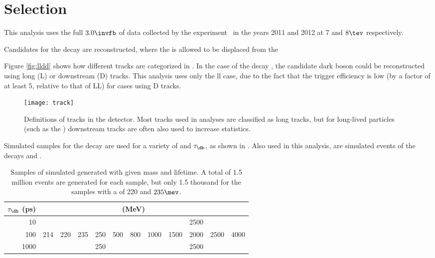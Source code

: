 \section{Selection}

This analysis uses the full $3.0\invfb$ of data collected by the \lhcb
experiment~ in the years 2011 and 2012 at 7 and $8\tev$ respectively.

Candidates for the decay \btokstrdb are reconstructed, where the \db is allowed to be displaced
from the

Figure \ref{fig:lldd} shows how different tracks are categorized in \lhcb.
In the case of the decay \decay{\db}{\mumu}, the candidate dark boson could be reconstructed using
long (L) or downstream (D) tracks.
This analysis uses only the ll case, due to the fact that the trigger efficiency is low (by a
factor of at least 5, relative to that of LL) for cases using D tracks.

\begin{figure}
  \begin{center}
    \texttt{[image: track]}
    \caption[Track definitions in the LHCb detector]{
      Definitions of tracks in the \lhcb detector.
      Most tracks used in analyses are classified as long tracks, but for long-lived particles
      (such as the \KS) downstream tracks are often also used to increase statistics.
    }
    \label{}
  \end{center}
\end{figure}

Simulated samples for the decay \btokstrdb are used for a variety of \mass{\db} and $\tau_\db$, as
shown in .
Also used in this analysis, are simulated events of the decays \btokstrmumu and \btojpsikstr.

\begin{table}
  \caption[Samples of simulated \btokstrdb generated for the analysis]{
    Samples of simulated \btokstrdb generated with given mass and lifetime.
    A total of 1.5 million events are generated for each sample, but only 1.5 thousand for the
    samples with a \mass{\db} of 220 and $235\mev$.
  }
  \label{tab:db:samples}
  \begin{center}
    \begin{tabular}{rccccccccccc}\toprule
      $\tau_\db$ (ps) & \multicolumn{10}{c}{\mass{\db} (MeV)} \\\midrule
      10 &&&&&&&&&2500 \\
      100 &214&220&235&250&500&800&1000&1500&2000&2500&4000 \\
      1000 &&&&250&&&&&2500 \\
      \bottomrule
    \end{tabular}
  \end{center}
\end{table}

